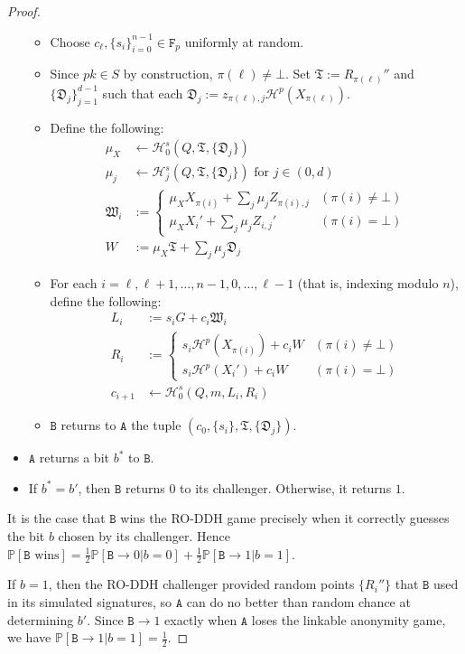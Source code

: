 \documentclass{llncs}
\newcommand{\A}{\texttt{A}}
\newcommand{\B}{\texttt{B}}
\newcommand{\F}{\texttt{F}_p}
\newcommand{\Hp}{\mathcal{H}^p}
\newcommand{\Hs}{\mathcal{H}^s}
\newcommand{\prob}{\mathbb{P}}
\begin{document}
\begin{proof}
\begin{itemize}
\begin{itemize}
\item Choose $c_{\ell}, \{s_i\}_{i=0}^{n-1} \in \F$ uniformly at random.
\item Since $pk \in S$ by construction, $\pi(\ell) \neq \bot$. Set $\mathfrak{T} := R_{\pi(\ell)}''$ and $\{\mathfrak{D}_j\}_{j=1}^{d-1}$ such that each $\mathfrak{D}_j := z_{\pi(\ell),j}\Hp(X_{\pi(\ell)})$.
\item Define the following:
\begin{align*}
\mu_X &\leftarrow \Hs_0(Q,\mathfrak{T},\{\mathfrak{D}_j\}) \\
\mu_j &\leftarrow \Hs_j(Q,\mathfrak{T},\{\mathfrak{D}_j\}) \text{ for } j \in (0,d) \\
\mathfrak{W}_i &:= \begin{cases} \mu_XX_{\pi(i)} + \sum_j \mu_jZ_{\pi(i),j} & (\pi(i) \neq \bot) \\ \mu_XX_i' + \sum_j \mu_jZ_{i,j}' & (\pi(i) = \bot) \end{cases} \\
W &:= \mu_X\mathfrak{T} + \sum_j \mu_j\mathfrak{D}_j
\end{align*}
\item For each $i = \ell,\ell+1,\ldots,n-1,0,\ldots,\ell-1$ (that is, indexing modulo $n$), define the following:
\begin{align*}
L_i &:= s_iG + c_i\mathfrak{W}_i \\
R_i &:= \begin{cases} s_i\Hp(X_{\pi(i)}) + c_iW & (\pi(i) \neq \bot) \\ s_i\Hp(X_i') + c_iW & (\pi(i) = \bot) \end{cases} \\
c_{i+1} &\leftarrow \Hs_0(Q,m,L_i,R_i)
\end{align*}
\item $\B$ returns to $\A$ the tuple $(c_0,\{s_i\},\mathfrak{T},\{\mathfrak{D}_j\})$.
\end{itemize}
\item $\A$ returns a bit $b^*$ to $\B$.
\item If $b^* = b'$, then $\B$ returns $0$ to its challenger. Otherwise, it returns $1$.
\end{itemize}

It is the case that $\B$ wins the RO-DDH game precisely when it correctly guesses the bit $b$ chosen by its challenger. Hence $\prob[\B \text{ wins}] = \frac{1}{2}\prob[\B \to 0 | b = 0] + \frac{1}{2}\prob[\B \to 1 | b = 1]$.

If $b = 1$, then the RO-DDH challenger provided random points $\{R_i''\}$ that $\B$ used in its simulated signatures, so $\A$ can do no better than random chance at determining $b'$. Since $\B \to 1$ exactly when $\A$ loses the linkable anonymity game, we have $\prob[\B \to 1 | b = 1] = \frac{1}{2}$.


\end{proof}
\end{document}
